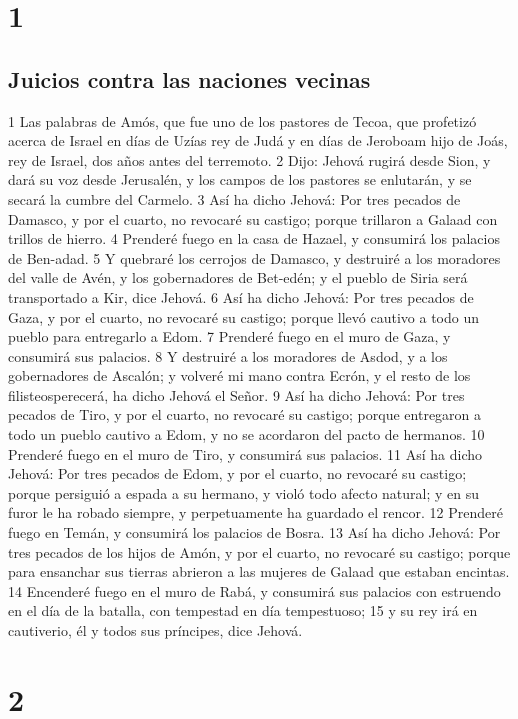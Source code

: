
\chapter{1}

\section*{Juicios contra las naciones vecinas}

1 Las palabras de Amós, que fue uno de los pastores de Tecoa, que profetizó acerca de Israel en días de Uzías rey de Judá y en días de Jeroboam hijo de Joás, rey de Israel, dos años antes del terremoto.
2 Dijo: Jehová rugirá desde Sion, y dará su voz desde Jerusalén, y los campos de los pastores se enlutarán, y se secará la cumbre del Carmelo.
3 Así ha dicho Jehová: Por tres pecados de Damasco, y por el cuarto, no revocaré su castigo; porque trillaron a Galaad con trillos de hierro.
4 Prenderé fuego en la casa de Hazael, y consumirá los palacios de Ben-adad.
5 Y quebraré los cerrojos de Damasco, y destruiré a los moradores del valle de Avén, y los gobernadores de Bet-edén; y el pueblo de Siria será transportado a Kir, dice Jehová.
6 Así ha dicho Jehová: Por tres pecados de Gaza, y por el cuarto, no revocaré su castigo; porque llevó cautivo a todo un pueblo para entregarlo a Edom.
7 Prenderé fuego en el muro de Gaza, y consumirá sus palacios.
8 Y destruiré a los moradores de Asdod, y a los gobernadores de Ascalón; y volveré mi mano contra Ecrón, y el resto de los filisteosperecerá, ha dicho Jehová el Señor.
9 Así ha dicho Jehová: Por tres pecados de Tiro, y por el cuarto, no revocaré su castigo; porque entregaron a todo un pueblo cautivo a Edom, y no se acordaron del pacto de hermanos.
10 Prenderé fuego en el muro de Tiro, y consumirá sus palacios.
11 Así ha dicho Jehová: Por tres pecados de Edom, y por el cuarto, no revocaré su castigo; porque persiguió a espada a su hermano, y violó todo afecto natural; y en su furor le ha robado siempre, y perpetuamente ha guardado el rencor.
12 Prenderé fuego en Temán, y consumirá los palacios de Bosra.
13 Así ha dicho Jehová: Por tres pecados de los hijos de Amón, y por el cuarto, no revocaré su castigo; porque para ensanchar sus tierras abrieron a las mujeres de Galaad que estaban encintas.
14 Encenderé fuego en el muro de Rabá, y consumirá sus palacios con estruendo en el día de la batalla, con tempestad en día tempestuoso;
15 y su rey irá en cautiverio, él y todos sus príncipes, dice Jehová.

\chapter{2}

